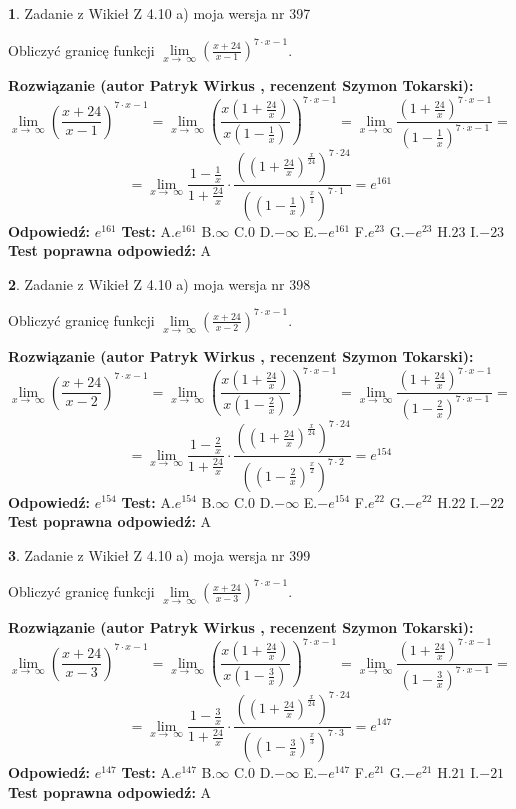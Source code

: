 \documentclass[12pt, a4paper]{article}
\theoremstyle{definition} %
\newtheorem{zad}{}
\newcommand{\zadStart}[1]{\begin{zad}#1\newline}
\newcommand{\zadStop}{\end{zad}}
\newcommand{\rozwStart}[2]{\noindent \textbf{Rozwiązanie (autor #1 , recenzent #2): }\newline}
\newcommand{\rozwStop}{\newline}
\newcommand{\odpStart}{\noindent \textbf{Odpowiedź:}\newline}
\newcommand{\odpStop}{\newline}
\newcommand{\testStart}{\noindent \textbf{Test:}\newline}
\newcommand{\testStop}{\newline}
\newcommand{\kluczStart}{\noindent \textbf{Test poprawna odpowiedź:}\newline}
\newcommand{\kluczStop}{\newline}
\begin{document}
\zadStart{Zadanie z Wikieł Z 4.10 a) moja wersja nr 397}

Obliczyć granicę funkcji  $\lim\limits_{x\to\ \infty}(\frac{x+24}{x-1})^{7\cdot x-1}$.
\zadStop
\rozwStart{Patryk Wirkus}{Szymon Tokarski}
$$\lim\limits_{x\to\ \infty}(\frac{x+24}{x-1})^{7\cdot x-1} = \lim\limits_{x\to\ \infty}(\frac{x(1+\frac{24}{x})}{x(1-\frac{1}{x})})^{7\cdot x-1}=\lim\limits_{x\to\ \infty}\frac{(1+\frac{24}{x})^{7\cdot x-1}}{(1-\frac{1}{x})^{7\cdot x-1}}=$$
$$=\lim\limits_{x\to\ \infty}\frac{1-\frac{1}{x}}{1+\frac{24}{x}}\cdot\frac{((1+\frac{24}{x})^{\frac{x}{24}})^{7\cdot24}}{((1-\frac{1}{x})^{\frac{x}{1}})^{7\cdot1}}=e^{161}$$
\rozwStop
\odpStart
$e^{161}$
\odpStop
\testStart
A.$e^{161}$ B.$\infty$ C.$0$ D.$-\infty$ E.$-e^{161}$
F.$e^{23}$ G.$-e^{23}$
H.$23$
I.$-23$
\testStop
\kluczStart
A
\kluczStop



\zadStart{Zadanie z Wikieł Z 4.10 a) moja wersja nr 398}

Obliczyć granicę funkcji  $\lim\limits_{x\to\ \infty}(\frac{x+24}{x-2})^{7\cdot x-1}$.
\zadStop
\rozwStart{Patryk Wirkus}{Szymon Tokarski}
$$\lim\limits_{x\to\ \infty}(\frac{x+24}{x-2})^{7\cdot x-1} = \lim\limits_{x\to\ \infty}(\frac{x(1+\frac{24}{x})}{x(1-\frac{2}{x})})^{7\cdot x-1}=\lim\limits_{x\to\ \infty}\frac{(1+\frac{24}{x})^{7\cdot x-1}}{(1-\frac{2}{x})^{7\cdot x-1}}=$$
$$=\lim\limits_{x\to\ \infty}\frac{1-\frac{2}{x}}{1+\frac{24}{x}}\cdot\frac{((1+\frac{24}{x})^{\frac{x}{24}})^{7\cdot24}}{((1-\frac{2}{x})^{\frac{x}{2}})^{7\cdot2}}=e^{154}$$
\rozwStop
\odpStart
$e^{154}$
\odpStop
\testStart
A.$e^{154}$ B.$\infty$ C.$0$ D.$-\infty$ E.$-e^{154}$
F.$e^{22}$ G.$-e^{22}$
H.$22$
I.$-22$
\testStop
\kluczStart
A
\kluczStop



\zadStart{Zadanie z Wikieł Z 4.10 a) moja wersja nr 399}

Obliczyć granicę funkcji  $\lim\limits_{x\to\ \infty}(\frac{x+24}{x-3})^{7\cdot x-1}$.
\zadStop
\rozwStart{Patryk Wirkus}{Szymon Tokarski}
$$\lim\limits_{x\to\ \infty}(\frac{x+24}{x-3})^{7\cdot x-1} = \lim\limits_{x\to\ \infty}(\frac{x(1+\frac{24}{x})}{x(1-\frac{3}{x})})^{7\cdot x-1}=\lim\limits_{x\to\ \infty}\frac{(1+\frac{24}{x})^{7\cdot x-1}}{(1-\frac{3}{x})^{7\cdot x-1}}=$$
$$=\lim\limits_{x\to\ \infty}\frac{1-\frac{3}{x}}{1+\frac{24}{x}}\cdot\frac{((1+\frac{24}{x})^{\frac{x}{24}})^{7\cdot24}}{((1-\frac{3}{x})^{\frac{x}{3}})^{7\cdot3}}=e^{147}$$
\rozwStop
\odpStart
$e^{147}$
\odpStop
\testStart
A.$e^{147}$ B.$\infty$ C.$0$ D.$-\infty$ E.$-e^{147}$
F.$e^{21}$ G.$-e^{21}$
H.$21$
I.$-21$
\testStop
\kluczStart
A
\kluczStop
\end{document}
